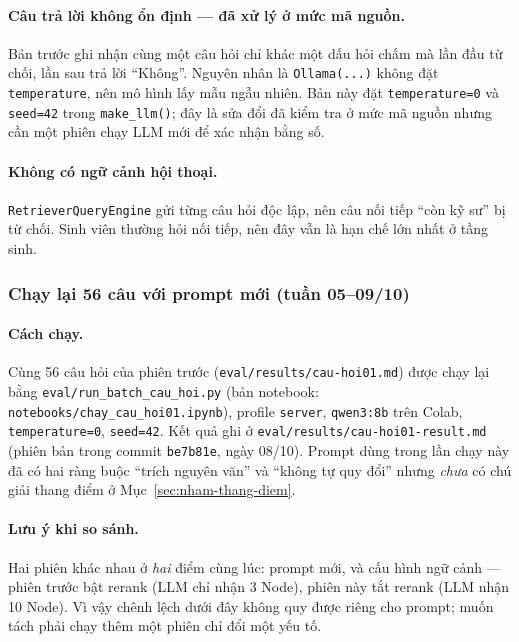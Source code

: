 \paragraph{Câu trả lời không ổn định --- đã xử lý ở mức mã nguồn.} Bản trước ghi nhận cùng một câu hỏi
chỉ khác một dấu hỏi chấm mà lần đầu từ chối, lần sau trả lời ``Không''. Nguyên nhân là
\texttt{Ollama(...)} không đặt \texttt{temperature}, nên mô hình lấy mẫu ngẫu nhiên. Bản này đặt
\texttt{temperature=0} và \texttt{seed=42} trong \texttt{make\_llm()}; đây là sửa đổi đã kiểm tra ở
mức mã nguồn nhưng cần một phiên chạy LLM mới để xác nhận bằng số.

\paragraph{Không có ngữ cảnh hội thoại.} \texttt{RetrieverQueryEngine} gửi từng câu hỏi độc lập, nên
câu nối tiếp ``còn kỹ sư'' bị từ chối. Sinh viên thường hỏi nối tiếp, nên đây vẫn là hạn chế lớn nhất
ở tầng sinh.

\subsubsection{Chạy lại 56 câu với prompt mới (tuần 05--09/10)}
\label{sec:chay-lai-56-cau}

\paragraph{Cách chạy.} Cùng 56 câu hỏi của phiên trước (\texttt{eval/results/cau-hoi01.md}) được chạy
lại bằng \texttt{eval/run\_batch\_cau\_hoi.py} (bản notebook: \texttt{notebooks/chay\_cau\_hoi01.ipynb}),
profile \texttt{server}, \texttt{qwen3:8b} trên Colab, \texttt{temperature=0}, \texttt{seed=42}. Kết quả
ghi ở \texttt{eval/results/cau-hoi01-result.md} (phiên bản trong commit \texttt{be7b81e}, ngày 08/10).
Prompt dùng trong lần chạy này đã có hai ràng buộc ``trích nguyên văn'' và ``không tự quy đổi'' nhưng
\emph{chưa} có chú giải thang điểm ở Mục~\ref{sec:nham-thang-diem}.

\paragraph{Lưu ý khi so sánh.} Hai phiên khác nhau ở \emph{hai} điểm cùng lúc: prompt mới, và cấu hình
ngữ cảnh --- phiên trước bật rerank (LLM chỉ nhận 3 Node), phiên này tắt rerank (LLM nhận 10 Node).
Vì vậy chênh lệch dưới đây không quy được riêng cho prompt; muốn tách phải chạy thêm một phiên chỉ đổi
một yếu tố.

